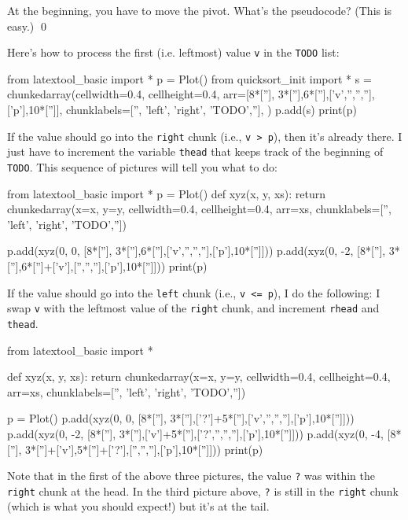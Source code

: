 \begin{ex}
At the beginning, you have to move the pivot.
What's the pseudocode? (This is easy.)
\qed
\end{ex}

Here's how to process the first (i.e. leftmost) value \verb!v!
in the \verb!TODO! list:
\begin{python}
from latextool_basic import *
p = Plot()
from quicksort_init import *
s = chunkedarray(cellwidth=0.4, 
                   cellheight=0.4,
                   arr=[8*[''], 3*[''],6*[''],['v','','',''],['p'],10*['']],
                   chunklabels=['', 'left', 'right', 'TODO',''],
)
p.add(s)
print(p)
\end{python}

If the value should go into the \verb!right! chunk
(i.e., \verb!v > p!), then it's already there.
I just have to increment the variable \verb!thead! that keeps track of the 
beginning of \verb!TODO!.
This sequence of pictures will tell you what to do:
\begin{python}
from latextool_basic import *
p = Plot()
def xyz(x, y, xs):
    return chunkedarray(x=x, y=y,
                        cellwidth=0.4, cellheight=0.4,
                        arr=xs,
                        chunklabels=['', 'left', 'right', 'TODO',''])

p.add(xyz(0, 0, [8*[''], 3*[''],6*[''],['v','','',''],['p'],10*['']]))
p.add(xyz(0, -2, [8*[''], 3*[''],6*['']+['v'],['','',''],['p'],10*['']]))
print(p)
\end{python}

If the value should go into the \verb!left! chunk (i.e., \verb!v <= p!), 
I do the following: I swap \verb!v!
with the leftmost value of the \verb!right! chunk,
and increment \verb!rhead! and \verb!thead!.
\begin{python}
from latextool_basic import *

def xyz(x, y, xs):
    return chunkedarray(x=x, y=y,
                        cellwidth=0.4, cellheight=0.4,
                        arr=xs,
                        chunklabels=['', 'left', 'right', 'TODO',''])

p = Plot()
p.add(xyz(0, 0, [8*[''], 3*[''],['?']+5*[''],['v','','',''],['p'],10*['']]))
p.add(xyz(0, -2, [8*[''], 3*[''],['v']+5*[''],['?','','',''],['p'],10*['']]))
p.add(xyz(0, -4, [8*[''], 3*['']+['v'],5*['']+['?'],['','',''],['p'],10*['']]))
print(p)
\end{python}
Note that in the first of the above three pictures,
the value \verb!?! was within the \verb!right! chunk
at the head.
In the third picture above, 
\verb!?! is still in the \verb!right! chunk
(which is what you should expect!) but it's at the tail.

